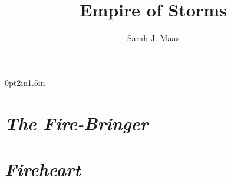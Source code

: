 \documentclass[10pt, openany]{book}
\title{Empire of Storms}
\author{Sarah J. Maas}
\date{}
\begin{document}


\blankpage

\blankpage




\tableofcontents

\newpage


\newpage %
\pdfpagewidth=5.5in \pdfpageheight=8.25in \eject %
\titlespacing*{\chapter} {0pt}{2in}{1.5in} %



\part{\emph{The Fire-Bringer}}








































\part{\emph{Fireheart}}







































\end{document}
